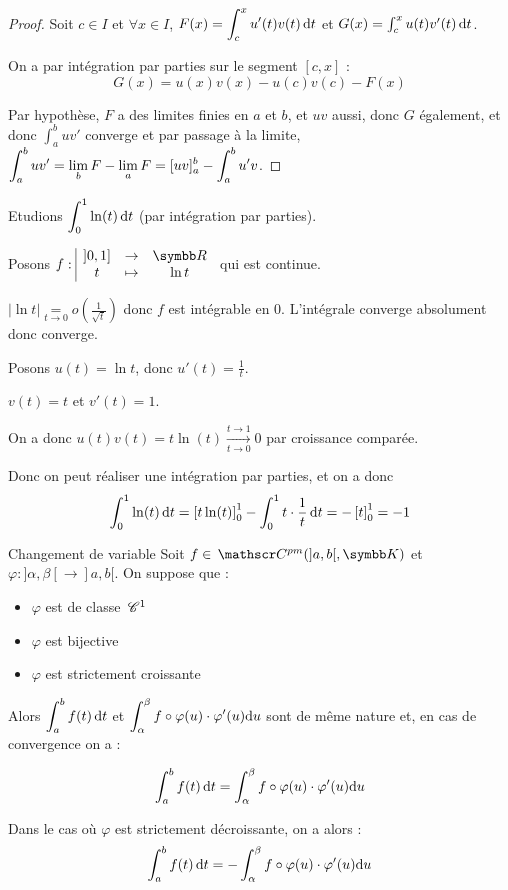 \begin{proof}
    Soit $c \in I$ et $\forall x \in I$, $F(x) = \displaystyle \int_c^x u'(t) v(t) \,\mathrm{d}t$ et 
    $G(x) = \int_c^x u(t) v'(t) \,\mathrm{d}t$.

    On a par intégration par parties sur le segment $[c, x]$ :
    $$ G(x) = u(x) v(x) - u(c) v(c) - F(x) $$

    Par hypothèse, $F$ a des limites finies en $a$ et $b$, et $uv$ aussi, donc $G$ également, et donc 
    $\int_{a }^{b } uv'$ converge et par passage à la limite, $\displaystyle \int_{a }^{b } uv' = \lim_b F - \lim_a F = [uv]_a^b - \int_a^b u'v$.
\end{proof}

\begin{exemple}
    Etudions $\displaystyle \int_{0}^{1 } \ln(t) \,\mathrm{d}t$ (par intégration par parties).

    Posons $\fonction f {]0, 1]}{\R}{t}{\ln t}$ qui est continue. 

    $|\ln t | \underset{t \to 0}{=} o \left( \frac 1 {\sqrt t} \right)$ donc $f$ est intégrable en $0$.
    L'intégrale converge absolument donc converge. 

    Posons $u(t) = \ln t$, donc $u'(t) = \frac 1 t$.

    $v(t) = t$ et $v'(t) = 1$.

    On a donc $u(t) v(t) = t \ln (t) \xrightarrow[t \to 0]{t \to 1} 0$ par croissance comparée.

    Donc on peut réaliser une intégration par parties, et on a donc 
    $$\displaystyle \int_{0}^{1} \ln(t) \,\mathrm{d}t = \left[ t \ln (t) \right]_0^1 - \int_0^1 t \cdot \frac 1 t \,\mathrm{d}t = - \left[ t \right]_0^1 = -1$$
\end{exemple}

\begin{theoreme}{Changement de variable}{}
    Soit $f \in \mc {pm} (]a, b[, \K)$ et $\varphi : ]\alpha, \beta[ \to ]a, b[$. 
    On suppose que : 
    \begin{itemize}
        \item $\varphi$ est de classe $\,\mathscr C^{1}$ 
        \item $\varphi$ est bijective
        \item $\varphi$ est strictement croissante
    \end{itemize}

    Alors $\displaystyle \int_{a }^{b } f(t) \,\mathrm{d}t$ et $\displaystyle \int_{\alpha }^{\beta } f \circ \varphi(u) \cdot \varphi'(u) \mathrm d u$ 
    sont de même nature et, en cas de convergence on a :
    
    $$\displaystyle \int_{a }^{b } f(t) \,\mathrm{d}t = \displaystyle \int_{\alpha }^{\beta } f \circ \varphi(u) \cdot \varphi'(u) \mathrm d u$$

    Dans le cas où $\varphi$ est strictement décroissante, on a alors : 
    $$\displaystyle \int_{a }^{b } f(t) \,\mathrm{d}t = - \displaystyle \int_{\alpha }^{\beta } f \circ \varphi(u) \cdot \varphi'(u) \mathrm d u$$
\end{theoreme}

